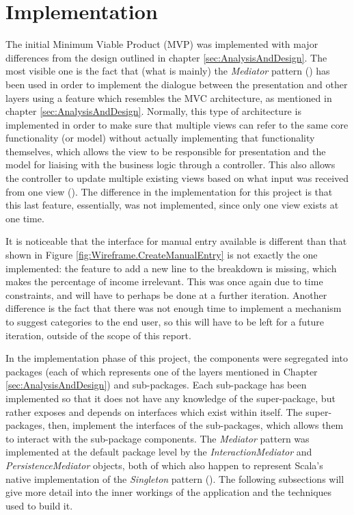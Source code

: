 \section{Implementation} \label{sec:Implementation}

The initial Minimum Viable Product (MVP) was implemented with major differences
from the design outlined in chapter \ref{sec:AnalysisAndDesign}.  The most
visible one is the fact that (what is mainly) the \emph{Mediator} pattern
(\cite[][Ch.~9,~Location~3594]{nikolov2016scala}) has been used in order to
implement the dialogue between the presentation and other layers using a
feature which resembles the MVC architecture, as mentioned in chapter
\ref{sec:AnalysisAndDesign}. Normally, this type of architecture is implemented
in order to make sure that multiple views can refer to the same core
functionality (or model) without actually implementing that functionality
themselves, which allows the view to be responsible for presentation and the
model for liaising with the business logic through a controller. This also
allows the controller to update multiple existing views based on what input was
received from one view (\cite[][p.~381]{bennett2010object}). The difference in
the implementation for this project is that this last feature, essentially, was
not implemented, since only one view exists at one time.

It is noticeable that the interface for manual entry available is different
than that shown in Figure \ref{fig:Wireframe.CreateManualEntry} is not exactly
the one implemented: the feature to add a new line to the breakdown is missing,
which makes the percentage of income irrelevant. This was once again due to
time constraints, and will have to perhaps be done at a further iteration.
Another difference is the fact that there was not enough time to implement a
mechanism to suggest categories to the end user, so this will have to be left
for a future iteration, outside of the scope of this report.

In the implementation phase of this project, the components were segregated
into packages (each of which represents one of the layers mentioned in Chapter
\ref{sec:AnalysisAndDesign}) and sub-packages. Each sub-package has been
implemented so that it does not have any knowledge of the super-package, but
rather exposes and depends on interfaces which exist within itself. The
super-packages, then, implement the interfaces of the sub-packages, which
allows them to interact with the sub-package components. The \emph{Mediator}
pattern was implemented at the default package level by the
\emph{InteractionMediator} and \emph{PersistenceMediator} objects, both of
which also happen to represent Scala's native implementation of the
\emph{Singleton} pattern (\cite[][Ch.~6,~Location.~2242]{nikolov2016scala}).
The following subsections will give more detail into the inner workings of the
application and the techniques used to build it.

